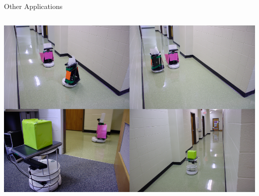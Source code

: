 \documentclass{beamer}
\begin{document}
\begin{frame}{Other Applications}
\begin{columns}
\begin{column}{0.5\textwidth}
      \begin{spacing}{0.5}
        {\tiny{}}
      \end{spacing}
      \vspace{0.5cm}
      \includegraphics[width=\textwidth]{images/patrolling.png}
      \begin{spacing}{0.5}
        {\tiny{}}
      \end{spacing}
    \end{column}
  \end{columns}
\end{frame}
\end{document}
